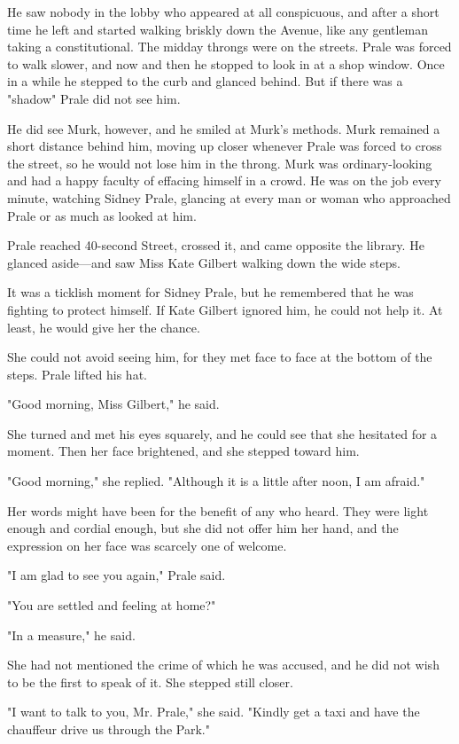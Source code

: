 \documentclass{novel}
\begin{document}
He saw nobody in the lobby who appeared at all conspicuous, and after a short time he left and started walking briskly down the Avenue, like any gentleman taking a constitutional. The midday throngs were on the streets. Prale was forced to walk slower, and now and then he stopped to look in at a shop window. Once in a while he stepped to the curb and glanced behind. But if there was a "shadow" Prale did not see him.

He did see Murk, however, and he smiled at Murk's methods. Murk remained a short distance behind him, moving up closer whenever Prale was forced to cross the street, so he would not lose him in the throng. Murk was ordinary-looking and had a happy faculty of effacing himself in a crowd. He was on the job every minute, watching Sidney Prale, glancing at every man or woman who approached Prale or as much as looked at him.

Prale reached 40-second Street, crossed it, and came opposite the library. He glanced aside---and saw Miss Kate Gilbert walking down the wide steps.

It was a ticklish moment for Sidney Prale, but he remembered that he was fighting to protect himself. If Kate Gilbert ignored him, he could not help it. At least, he would give her the chance.

She could not avoid seeing him, for they met face to face at the bottom of the steps. Prale lifted his hat.

"Good morning, Miss Gilbert," he said.

She turned and met his eyes squarely, and he could see that she hesitated for a moment. Then her face brightened, and she stepped toward him.

"Good morning," she replied. "Although it is a little after noon, I am afraid."

Her words might have been for the benefit of any who heard. They were light enough and cordial enough, but she did not offer him her hand, and the expression on her face was scarcely one of welcome.

"I am glad to see you again," Prale said.

"You are settled and feeling at home?"

"In a measure," he said.

She had not mentioned the crime of which he was accused, and he did not wish to be the first to speak of it. She stepped still closer.

"I want to talk to you, Mr. Prale," she said. "Kindly get a taxi and have the chauffeur drive us through the Park."
\end{document}
